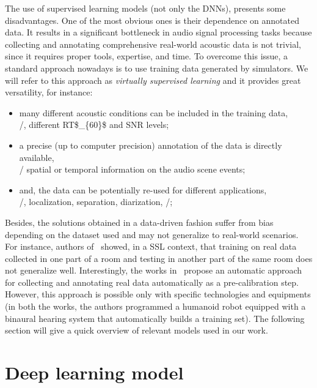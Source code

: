 \mynewline
The use of supervised learning models (not only the \acp{DNN}), presents some disadvantages.
One of the most obvious ones is their dependence on annotated data. It results in a significant bottleneck in audio signal processing tasks because collecting and annotating comprehensive real-world acoustic data is not trivial, since it requires proper tools, expertise, and time.
To overcome this issue, a standard approach nowadays is to use training data generated by simulators.
We will refer to this approach as \textit{virtually supervised learning} and it provides great versatility, for instance:
\begin{itemize}
    \item many different acoustic conditions can be included in the training data,\\\eg/, different \acf{RT$_{60}$} and \acf{SNR} levels;
    \item a precise (up to computer precision) annotation of the data is directly available,\\\eg/ spatial or temporal information on the audio scene events;
    \item and, the data can be potentially re-used for different applications,\\\eg/, localization, separation, diarization, \etc/;
\end{itemize}
Besides, the solutions obtained in a data-driven fashion suffer from bias depending on the dataset used and may not generalize to real-world scenarios.
For instance, authors of~ showed, in a \ac{SSL} context, that training on real data collected in one part of a room and testing in another part of the same room does not generalize well.
Interestingly, the works in~ propose an automatic approach for collecting and annotating real data automatically as a pre-calibration step.
However, this approach is possible only with specific technologies and equipments (in both the works, the authors programmed a humanoid robot equipped with a binaural hearing system that automatically builds a training set).
The following section will give a quick overview of relevant models used in our work.

\section{Deep learning model}\label{sec:lantern:dnn}


